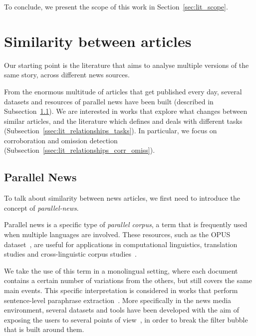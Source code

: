 To conclude, we present the scope of this work in Section~\ref{sec:lit_scope}.







\section{\statusgreen Similarity between articles}
\label{sec:lit_relationships}

Our starting point is the literature that aims to analyse multiple versions of the same story, across different news sources.

From the enormous multitude of articles that get published every day, several datasets and resources of parallel news have been built (described in Subsection~\ref{ssec:lit_relationships_parallel}).
We are interested in works that explore what changes between similar articles, and the literature which defines and deals with different tasks (Subsection~\ref{ssec:lit_relationships_tasks}). In particular, we focus on corroboration and omission detection (Subsection~\ref{ssec:lit_relationships_corr_omiss}).

\subsection{\statusgreen Parallel News}
\label{ssec:lit_relationships_parallel}

To talk about similarity between news articles, we first need to introduce the concept of \emph{\gls{parallel-news}}.

Parallel news is a specific type of \emph{parallel corpus}, a term that is frequently used when multiple languages are involved.
These resources, such as the OPUS dataset~\citep{tiedemann2012parallel}, are useful for applications in computational linguistics, translation studies and cross-linguistic corpus studies~\citep{brown1991aligning,ramesh2022samanantar,ziemski2016united,kunchukuttan2017iit,banon2020paracrawl}.

We take the use of this term in a monolingual setting, where each document contains a certain number of variations from the others, but still covers the same main events.
This specific interpretation is considered in works that perform sentence-level paraphrase extraction~\citep{dolan2004unsupervised,zhang2013harvesting}.
More specifically in the news media environment, several datasets and tools have been developed with the aim of exposing the users to several points of view~\citep{bozdag2015breaking}, in order to break the filter bubble~\citep{pariser2011filter} that is built around them.

